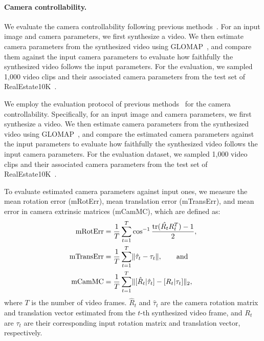 \paragraph{Camera controllability.}
We evaluate the camera controllability following previous methods~\cite{he2024cameractrl,zheng2024cami2v}.
For an input image and camera parameters, we first synthesize a video.
We then estimate camera parameters from the synthesized video using GLOMAP~\cite{pan2024global}, and compare them against the input camera parameters to evaluate how faithfully the synthesized video follows the input parameters.
For the evaluation, we sampled 1,000 video clips and their associated camera parameters from the test set of RealEstate10K~\cite{zhou2018stereo}.


We employ the evaluation protocol of previous methods~\cite{he2024cameractrl,zheng2024cami2v} for the camera controllability. Specifically, for an input image and camera parameters, we first synthesize a video. We then estimate camera parameters from the synthesized video using GLOMAP~\cite{pan2024global}, and compare the estimated camera parameters against the input parameters to evaluate how faithfully the synthesized video follows the input camera parameters. For the evaluation dataset, we sampled 1,000 video clips and their associated camera parameters from the test set of RealEstate10K~\cite{zhou2018stereo}.


To evaluate estimated camera parameters against input ones,
we measure the mean rotation error (mRotErr), mean translation error (mTransErr), and mean error in camera extrinsic matrices (mCamMC), which are defined as:
\begin{equation}
\vspace{-2.5mm}
\begin{aligned}
\textnormal{mRotErr}&=\frac{1}{T} \sum\limits_{t=1}^{T} \cos^{-1}\frac{\textrm{tr}(\hat{R_t}R_t^{T}) - 1}{2}, \\
\vspace{-2.3mm}
\textnormal{mTransErr}&=\frac{1}{T} \sum\limits_{t=1}^{T} \lVert \hat{\tau}_t - \tau_{t} \rVert,~~~~~~\textrm{and} \\
\vspace{-2.3mm}
\textnormal{mCamMC}&=\frac{1}{T} \sum\limits_{t=1}^{T} \lVert [\hat{R}_t|\hat{\tau}_t] - [R_t|\tau_{t}] \rVert_{2}, \\
\end{aligned}
\end{equation}
where $T$ is the number of video frames.
$\hat{R}_t$ and $\hat{\tau}_t$ are the camera rotation matrix and translation vector estimated from the $t$-th synthesized video frame, and $R_t$ are $\tau_t$ are their corresponding input rotation matrix and translation vector, respectively.





